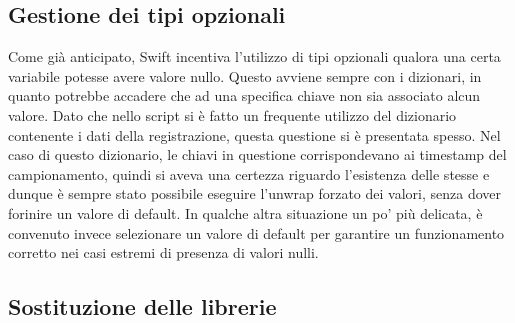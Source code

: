 \subsection{Gestione dei tipi opzionali}

Come già anticipato, Swift incentiva l'utilizzo di tipi opzionali qualora una certa 
variabile potesse avere valore nullo. Questo avviene sempre con i dizionari, in quanto
potrebbe accadere che ad una specifica chiave non sia associato alcun valore. Dato che
nello script si è fatto un frequente utilizzo del dizionario contenente i dati della
registrazione, questa questione si è presentata spesso. Nel caso di questo dizionario,
le chiavi in questione corrispondevano ai timestamp del campionamento, quindi si 
aveva una certezza riguardo l'esistenza delle stesse e dunque è sempre stato possibile 
eseguire l'unwrap forzato dei valori, senza dover forinire un valore di default.
In qualche altra situazione un po' più delicata, è convenuto invece selezionare un
valore di default per garantire un funzionamento corretto nei casi estremi di presenza
di valori nulli. 

\subsection{Sostituzione delle librerie}

